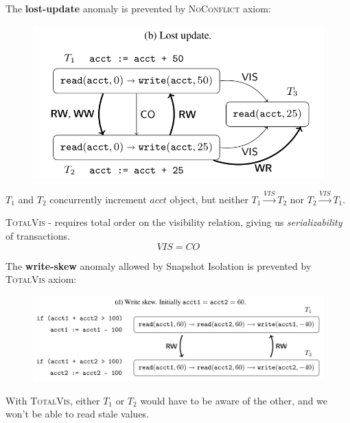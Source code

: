 \documentclass{beamer}
\begin{document}
\begin{frame}
	The \textbf{lost-update} anomaly is prevented by \textsc{NoConflict} axiom:
	\begin{figure}
		\includegraphics[scale=0.3]{fig2b}
	\end{figure}
	\begin{example}
		$T_1$ and $T_2$ concurrently increment $acct$ object, but neither $T_1\xrightarrow{VIS} T_2$ nor $T_2 \xrightarrow{VIS} T_1$.
	\end{example}
\end{frame}

\begin{frame}
	\begin{definition}
		\textsc{TotalVis} - requires total order on the visibility relation, giving us \emph{serializability} of transactions.
		$$ VIS = CO $$
	\end{definition}
\end{frame}

\begin{frame}
	The \textbf{write-skew} anomaly allowed by Snapshot Isolation is prevented by \textsc{TotalVis} axiom:
	\begin{figure}
		\includegraphics[scale=0.25]{fig2d}
	\end{figure}
	\begin{example}
		With \textsc{TotalVis}, either $T_1$ or $T_2$ would have to be aware of the other, and we won't be able to read stale values.
	\end{example}
\end{frame}
\end{document}

